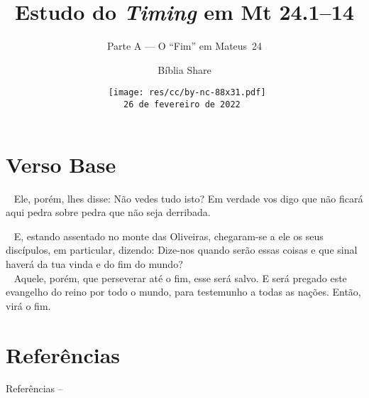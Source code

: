 \documentclass[12pt,aspectratio=169]{beamer}
\title{Estudo do \textit{Timing} em Mt 24.1--14}
\subtitle{Parte A --- O ``Fim'' em Mateus~24}
\author{Bíblia Share}
\date[{\tiny\tt{26 de fevereiro de 2022}}]{{\scriptsize\tt%
    \texttt{[image: res/cc/by-nc-88x31.pdf]}\\[\smallskipamount]
    26 de fevereiro de 2022%
}}
\newcommand{\ver}[1]{%
    \raisebox{0.50ex}{%
        \scalebox{1.1}{%
            \pmb{\textbf{\textcolor{BSpbg}{#1}}}%
        }%
    }%
}
\newcommand{\QUOTE}[1]{%
    \par\noindent\hspace*{0.1\linewidth}%
    \begin{minipage}{0.8\linewidth}%
        \linespread{1.35}\large{#1}%
    \end{minipage}%
}
\newcommand{\YEL}[1]{{\textcolor{TXyel}{#1}}}
\newcommand{\GRE}[1]{{\textcolor{TXgre}{#1}}}
\newcommand{\MAG}[1]{{\textcolor{TXmag}{#1}}}
\begin{document}
\begin{frame}
    \titlepage
\end{frame}
\section{Verso Base}

    \begin{frame}
        \QUOTE{%
            \ver{(ARA) Mt~24.2}~%
            Ele, porém, lhes disse: \YEL{Não vedes tudo isto? Em verdade vos  digo  que  não
            ficará aqui pedra sobre pedra que não seja derribada.}
        }
    \end{frame}

    \begin{frame}
        \QUOTE{%
            \ver{(ARC) Mt~24.3}~%
            E, estando  assentado  no  monte  das  Oliveiras,  chegaram-se  a  ele  os  seus
            discípulos, em particular, dizendo: Dize-nos \YEL{quando serão essas  coisas}  e
            \GRE{que sinal haverá da tua vinda} e do \MAG{fim do mundo?} \\[\medskipamount]
            \ver{(ARA) Mt~24.13,14}~%
            Aquele, porém, que perseverar até o \MAG{fim}, esse será salvo. E  será  pregado
            este evangelho do reino por todo o mundo, para testemunho  a  todas  as  nações.
            Então, virá o \MAG{fim}.
        }
    \end{frame}

\section{Referências}

    \begin{frame}[allowframebreaks]{Referências -- }
        
        
    \end{frame}

\end{document}
